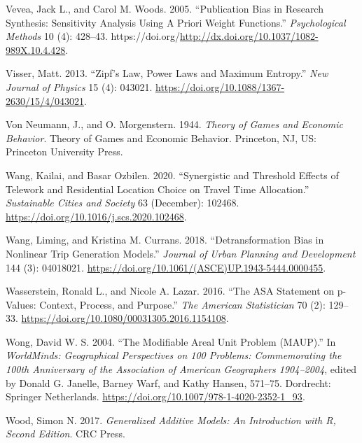 \documentclass[
  11pt,
  openany]{memoir}
\newlength{\cslhangindent}
\newlength{\cslentryspacingunit} %
\newenvironment{CSLReferences}[2] %
 {%
  \setlength{\parindent}{0pt}
  \ifodd #1
  \let\oldpar\par
  \def\par{\hangindent=\cslhangindent\oldpar}
  \fi
  \setlength{\parskip}{#2\cslentryspacingunit}
 }%
 {}
\begin{document}
\begin{CSLReferences}{1}{0}
\leavevmode{}%
Vevea, Jack L., and Carol M. Woods. 2005. {``Publication {Bias} in {Research Synthesis}: Sensitivity {Analysis Using A Priori Weight Functions}.''} \emph{Psychological Methods} 10 (4): 428--43. https://doi.org/\url{http://dx.doi.org/10.1037/1082-989X.10.4.428}.

\leavevmode{}%
Visser, Matt. 2013. {``Zipf's Law, Power Laws and Maximum Entropy.''} \emph{New Journal of Physics} 15 (4): 043021. \url{https://doi.org/10.1088/1367-2630/15/4/043021}.

\leavevmode{}%
Von Neumann, J., and O. Morgenstern. 1944. \emph{Theory of Games and Economic Behavior}. Theory of Games and Economic Behavior. {Princeton, NJ, US}: {Princeton University Press}.

\leavevmode{}%
Wang, Kailai, and Basar Ozbilen. 2020. {``Synergistic and Threshold Effects of Telework and Residential Location Choice on Travel Time Allocation.''} \emph{Sustainable Cities and Society} 63 (December): 102468. \url{https://doi.org/10.1016/j.scs.2020.102468}.

\leavevmode{}%
Wang, Liming, and Kristina M. Currans. 2018. {``Detransformation {Bias} in {Nonlinear Trip Generation Models}.''} \emph{Journal of Urban Planning and Development} 144 (3): 04018021. \url{https://doi.org/10.1061/(ASCE)UP.1943-5444.0000455}.

\leavevmode{}%
Wasserstein, Ronald L., and Nicole A. Lazar. 2016. {``The {ASA Statement} on p-{Values}: Context, {Process}, and {Purpose}.''} \emph{The American Statistician} 70 (2): 129--33. \url{https://doi.org/10.1080/00031305.2016.1154108}.

\leavevmode{}%
Wong, David W. S. 2004. {``The {Modifiable Areal Unit Problem} ({MAUP}).''} In \emph{{WorldMinds}: Geographical {Perspectives} on 100 {Problems}: Commemorating the 100th {Anniversary} of the {Association} of {American Geographers} 1904--2004}, edited by Donald G. Janelle, Barney Warf, and Kathy Hansen, 571--75. {Dordrecht}: {Springer Netherlands}. \url{https://doi.org/10.1007/978-1-4020-2352-1_93}.

\leavevmode{}%
Wood, Simon N. 2017. \emph{Generalized {Additive Models}: An {Introduction} with {R}, {Second Edition}}. {CRC Press}.


\end{CSLReferences}
\end{document}
